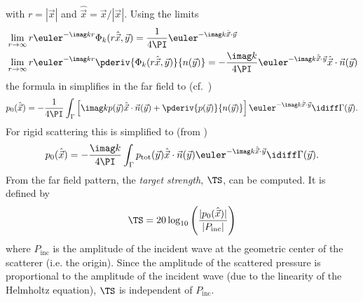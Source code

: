 with $r = |\vec{x}|$ and $\hat{\vec{x}} = \vec{x}/|\vec{x}|$. Using the limits
\begin{equation}\label{Eq4:Phi_k_limits}
\begin{aligned}
	&\lim_{r\to\infty} r\euler^{-\imag k r}\Phi_k(r\hat{\vec{x}},\vec{y}) = \frac{1}{4\PI}\euler^{-\imag k \hat{\vec{x}}\cdot\vec{y}}\\
	&\lim_{r\to\infty} r\euler^{-\imag k r}\pderiv{\Phi_k(r\hat{\vec{x}},\vec{y})}{n(\vec{y})} = -\frac{\imag k}{4\PI}\euler^{-\imag k \hat{\vec{x}}\cdot\vec{y}}\hat{\vec{x}}\cdot\vec{n}(\vec{y})
\end{aligned}	
\end{equation}
the formula in  simplifies in the far field to (cf.~\cite[p. 32]{Ihlenburg1998fea})
\begin{equation}\label{Eq4:KirchhoffIntegralFarField}
	p_0(\hat{\vec{x}}) = -\frac{1}{4\PI}\int_{\Gamma}\left[ \imag k p(\vec{y})\hat{\vec{x}}\cdot\vec{n}(\vec{y}) + \pderiv{p(\vec{y})}{n(\vec{y})}\right]\euler^{-\imag k \hat{\vec{x}}\cdot\vec{y}}\idiff \Gamma(\vec{y}).
\end{equation}
For rigid scattering this is simplified to (from )
\begin{equation}\label{Eq4:KirchhoffIntegralFarField2}
	p_0(\hat{\vec{x}}) = -\frac{\imag k}{4\PI}\int_{\Gamma} p_{\mathrm{tot}}(\vec{y})\hat{\vec{x}}\cdot\vec{n}(\vec{y}) \euler^{-\imag k \hat{\vec{x}}\cdot\vec{y}}\idiff \Gamma(\vec{y}).
\end{equation}
From the far field pattern, the \textit{target strength}, $\TS$, can be computed. It is defined by
\begin{equation}\label{Eq4:TS}
	\TS = 20\log_{10}\left(\frac{|p_0(\hat{\vec{x}})|}{|P_{\mathrm{inc}}|}\right)
\end{equation}
where $P_{\mathrm{inc}}$ is the amplitude of the incident wave at the geometric center of the scatterer (i.e. the origin). Since the amplitude of the scattered pressure is proportional to the amplitude of the incident wave (due to the linearity of the Helmholtz equation), $\TS$ is independent of $P_{\mathrm{inc}}$.


